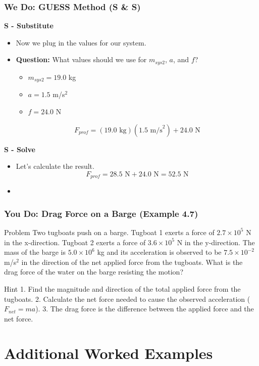 \documentclass{beamer}
\begin{document}
\begin{frame}
\frametitle{We Do: GUESS Method (S \& S)}
\textbf{S - Substitute}
\begin{itemize}
    \item Now we plug in the values for our system.
    \pause
    \item \textbf{Question:} What values should we use for $m_{sys2}$, $a$, and $f$?
    \begin{itemize}
        \item $m_{sys2} = 19.0$ kg
        \item $a = 1.5$ m/s$^2$
        \item $f = 24.0$ N
    \end{itemize}
    \[ F_{prof} = (19.0 \text{ kg})(1.5 \text{ m/s}^2) + 24.0 \text{ N} \]
\end{itemize}
\pause
\textbf{S - Solve}
\begin{itemize}
    \item Let's calculate the result.
    \[ F_{prof} = 28.5 \text{ N} + 24.0 \text{ N} = 52.5 \text{ N} \]
    \item {}
\end{itemize}
\end{frame}

\begin{frame}
\frametitle{You Do: Drag Force on a Barge (Example 4.7)}
\begin{block}{Problem}
Two tugboats push on a barge. Tugboat 1 exerts a force of $2.7 \times 10^5$ N in the x-direction. Tugboat 2 exerts a force of $3.6 \times 10^5$ N in the y-direction. The mass of the barge is $5.0 \times 10^6$ kg and its acceleration is observed to be $7.5 \times 10^{-2}$ m/s$^2$ in the direction of the net applied force from the tugboats.
\newline
\newline
What is the drag force of the water on the barge resisting the motion?
\end{block}

\begin{alertblock}{Hint}
1. Find the magnitude and direction of the total applied force from the tugboats.
2. Calculate the net force needed to cause the observed acceleration ($F_{net}=ma$).
3. The drag force is the difference between the applied force and the net force.
\end{alertblock}
\end{frame}

\section{Additional Worked Examples}
\end{document}
